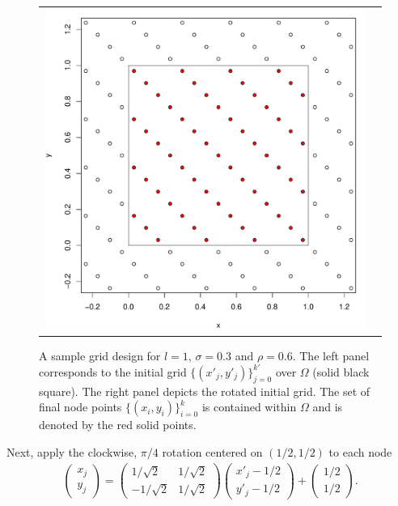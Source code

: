 \documentclass[10pt]{article}
\begin{document}
\begin{figure}
\begin{tabular}{cc}
\begin{minipage}{0.4\textwidth}
      \includegraphics[width=1\linewidth]{nodes-2.pdf}
    \end{minipage}
  \end{tabular}
  \caption{A sample grid design for $l=1$, $\sigma=0.3$ and $\rho=0.6$. The
    left panel corresponds to the initial grid
    $\{ (x'_j,y'_j) \}_{j=0}^{k'}$ over $\Omega$ (solid black
    square). The right panel depicts the rotated initial grid. The set
    of final node points $\{ (x_i,y_i) \}_{i=0}^{k}$ is contained
    within $\Omega$ and is denoted by the red solid points.}
  \label{fig:grids}
\end{figure}
Next, apply the clockwise, $\pi/4$ rotation centered on
$(1/2, 1/2)$ to each node
\begin{align*}
  \left( \begin{array}{c}
           x_j \\
           y_j
         \end{array} \right) =
       \left( \begin{array}{cc}
                1/\sqrt{2} & 1/\sqrt{2} \\
                -1/\sqrt{2} & 1/\sqrt{2}
              \end{array} \right) 
            \left( \begin{array}{c}
                     x'_j - 1/2\\
                     y'_j -1/2
                   \end{array} \right) +
  \left( \begin{array}{c}
           1/2 \\ 1/2
           \end{array} \right).
\end{align*}
\end{document}

